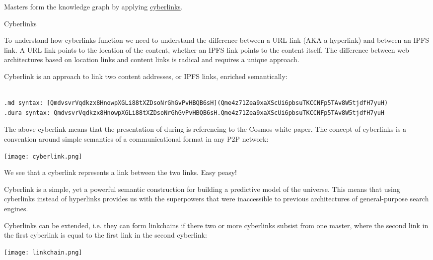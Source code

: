 \documentclass[8pt,oneside]{amsart}
\makeatletter
\newcommand{\linkred}[2]{\href{#1}{\color{red}{#2}}}
\renewcommand\subsection{\@startsection{subsection}
                                    {2}{\z@}
                                    {-3.25ex\@plus -1ex \@minus -.2ex}
                                    {0ex \@plus .2ex}
                                    {\play\Large}
                        }
\newcommand{\titleSection}[1]{\subsection{#1}}
\newenvironment{Figure}
  {\par\medskip\noindent\minipage{\linewidth}}
  {\endminipage\par\medskip}
\makeatother
\begin{document}
Masters form the knowledge graph by applying {\hyperref[cyberlinks]{cyberlinks}}.

\titleSection{Cyberlinks}\label{cyberlinks}

To understand how cyberlinks function we need to understand the difference between a URL link (AKA a hyperlink) and between an IPFS link. A URL link points to the location of the content, whether an IPFS link points to the content itself. The difference between web architectures based on location links and content links is radical and requires a unique approach.

Cyberlink is an approach to link two content addresses, or IPFS links, enriched semantically:

\begin{lstlisting}

.md syntax: [QmdvsvrVqdkzx8HnowpXGLi88tXZDsoNrGhGvPvHBQB6sH](Qme4z71Zea9xaXScUi6pbsuTKCCNFp5TAv8W5tjdfH7yuH)
.dura syntax: QmdvsvrVqdkzx8HnowpXGLi88tXZDsoNrGhGvPvHBQB6sH.Qme4z71Zea9xaXScUi6pbsuTKCCNFp5TAv8W5tjdfH7yuH
\end{lstlisting}

The above cyberlink means that the presentation of \linkred{https://github.com/cybercongress/go-cyber}{go-cyber} during \linkred{https://etherscan.io/token/0x61B81103e716B611Fff8aF5A5Dc8f37C628efb1E}{cyberc0n} is referencing to the Cosmos white paper. The concept of cyberlinks is a convention around simple semantics of a communicational format in any P2P network:

\begin{Figure}
    \centering
    \texttt{[image: cyberlink.png]}
\end{Figure}

We see that a cyberlink represents a link between the two links. Easy peasy!

Cyberlink is a simple, yet a powerful semantic construction for building a predictive model of the universe. This means that using cyberlinks instead of hyperlinks provides us with the superpowers that were inaccessible to previous architectures of general-purpose search engines.

Cyberlinks can be extended, i.e. they can form linkchains if there two or more cyberlinks subsist from one master, where the second link in the first cyberlink is equal to the first link in the second cyberlink:

\begin{Figure}
    \centering
    \texttt{[image: linkchain.png]}
\end{Figure}
\end{document}
